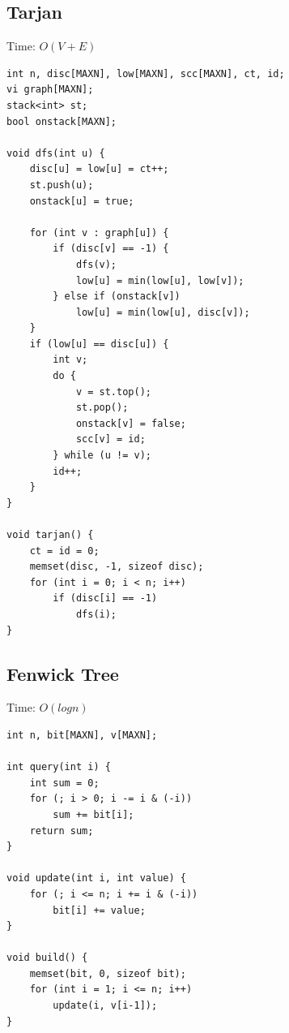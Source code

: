 \documentclass[oneside]{article}
\begin{document}
\subsection{Tarjan}
Time: $O(V + E)$
\begin{lstlisting}
int n, disc[MAXN], low[MAXN], scc[MAXN], ct, id;
vi graph[MAXN];
stack<int> st;
bool onstack[MAXN];

void dfs(int u) {
    disc[u] = low[u] = ct++;
    st.push(u);
    onstack[u] = true;

    for (int v : graph[u]) {
        if (disc[v] == -1) {
            dfs(v);
            low[u] = min(low[u], low[v]);
        } else if (onstack[v])
            low[u] = min(low[u], disc[v]);
    }
    if (low[u] == disc[u]) {
        int v;
        do {
            v = st.top();
            st.pop();
            onstack[v] = false;
            scc[v] = id;
        } while (u != v);
        id++;
    }
}

void tarjan() {
    ct = id = 0;
    memset(disc, -1, sizeof disc);
    for (int i = 0; i < n; i++)
        if (disc[i] == -1)
            dfs(i);
}
\end{lstlisting}

\subsection{Fenwick Tree}
Time: $O(logn)$
\begin{lstlisting}
int n, bit[MAXN], v[MAXN];

int query(int i) {
    int sum = 0;
    for (; i > 0; i -= i & (-i))
        sum += bit[i];
    return sum;
}

void update(int i, int value) {
    for (; i <= n; i += i & (-i))
        bit[i] += value;
}

void build() {
    memset(bit, 0, sizeof bit);
    for (int i = 1; i <= n; i++)
        update(i, v[i-1]);
}
\end{lstlisting}
\pagebreak
\end{document}
